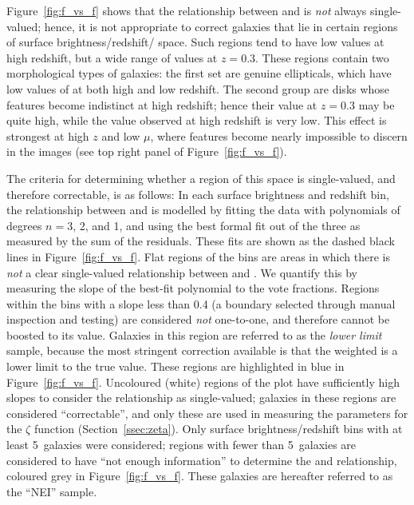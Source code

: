 \documentclass[a4paper,fleqn,usenatbib]{mnras}
\begin{document}
Figure~\ref{fig:f_vs_f} shows that the relationship between \ffeaturesz{} and
\ffeaturesrest{} is \emph{not} always single-valued; hence, it is not
appropriate to correct galaxies that lie in certain regions of surface
brightness/redshift/\ffeatures{} space. Such regions tend to have low
\ffeatures{} values at high redshift, but a wide range of values at $z=0.3$.
These regions contain two morphological types of galaxies: the first set are
genuine ellipticals, which have low values of \ffeatures{} at both high and low
redshift. The second group are disks whose features become indistinct at high
redshift; hence their \ffeatures{} value at $z=0.3$ may be quite high, while
the value observed at high redshift is very low. This effect is strongest at
high $z$ and low $\mu$, where features become nearly impossible to discern in
the images (see top right panel of Figure~\ref{fig:f_vs_f}).

The criteria for determining whether a region of this space is single-valued,
and therefore correctable, is as follows: In each surface brightness and
redshift bin, the relationship between \ffeaturesz{} and \ffeaturesrest{} is
modelled by fitting the data with polynomials of degrees $n=3$, 2, and 1, and
using the best formal fit out of the three as measured by the sum of the
residuals. These fits are shown as the dashed black lines in
Figure~\ref{fig:f_vs_f}. Flat regions of the bins are areas in which there is
\emph{not} a clear single-valued relationship between \ffeaturesz{} and
\ffeaturesrest. We quantify this by measuring the slope of the best-fit
polynomial to the vote fractions. Regions within the bins with a slope less than 0.4
(a boundary selected through manual inspection and testing) are considered
\emph{not} one-to-one, and therefore \ffeaturesz{} cannot be boosted to its
\ffeaturesrest{} value.  Galaxies in this region are referred to as the
\emph{lower limit} sample, because the most stringent correction available is
that the weighted \ffeatures{} is a lower limit to the true value.  These
regions are highlighted in blue in Figure~\ref{fig:f_vs_f}. Uncoloured (white)
regions of the plot have sufficiently high slopes to consider the relationship
as single-valued; galaxies in these regions are considered ``correctable'', and
only these are used in measuring the parameters for the $\zeta$ function
(Section~\ref{ssec:zeta}). Only surface brightness/redshift bins with at least
5~galaxies were considered; regions with fewer than 5~galaxies are considered
to have ``not enough information'' to determine the \ffeaturesz{} and
\ffeaturesrest{} relationship, coloured grey in Figure~\ref{fig:f_vs_f}. These
galaxies are hereafter referred to as the ``NEI'' sample.
\end{document}
